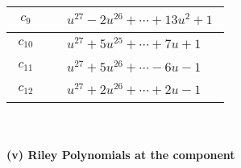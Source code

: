 \documentclass[1p]{elsarticle_modified}
\theoremstyle{definition}
\begin{document}
\begin{tabular}{m{50pt}|m{274pt}}
\hline $$\begin{aligned}c_{9}\end{aligned}$$&$\begin{aligned}
&u^{27}-2 u^{26}+\cdots+13 u^2+1
\end{aligned}$\\
\hline $$\begin{aligned}c_{10}\end{aligned}$$&$\begin{aligned}
&u^{27}+5 u^{25}+\cdots+7 u+1
\end{aligned}$\\
\hline $$\begin{aligned}c_{11}\end{aligned}$$&$\begin{aligned}
&u^{27}+5 u^{26}+\cdots-6 u-1
\end{aligned}$\\
\hline $$\begin{aligned}c_{12}\end{aligned}$$&$\begin{aligned}
&u^{27}+2 u^{26}+\cdots+2 u-1
\end{aligned}$\\
\hline
\end{tabular}\\~\\
\newpage\renewcommand{\arraystretch}{1}
\flushleft \textbf{(v) Riley Polynomials at the component}\newline \\
\end{document}
